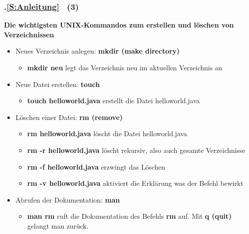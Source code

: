 \begin{frame}[t]%
\frametitle{\kap.\ref{S:Anleitung} \stitle\ (3)}%
\medskip

\textbf{Die wichtigsten UNIX-Kommandos zum erstellen und l\"oschen von Verzeichnissen}
\begin{itemize}
  \setlength{\itemsep}{4pt}
  \item Neues Verzeichnis anlegen: \textbf{mkdir (make directory)}
  \begin{itemize}
    \item \textbf{mkdir neu} legt das Verzeichnis neu im aktuellen Verzeichnis an
  \end{itemize}
  \item Neue Datei erstellen: \textbf{touch}
  \begin{itemize}
    \item \textbf{touch helloworld.java} erstellt die Datei helloworld.java
  \end{itemize}
  \item L\"oschen einer Datei: \textbf{rm (remove)}
  \begin{itemize}
    \setlength{\itemsep}{2pt}
    \item \textbf{rm helloworld.java} l\"oscht die Datei helloworld.java
    \item \textbf{rm -r helloworld.java} l\"oscht rekursiv, also auch gesamte Verzeichnisse
    \item \textbf{rm -f helloworld.java} erzwingt das L\"oschen
    \item \textbf{rm -v helloworld.java} aktiviert die Erkl\"arung was der Befehl bewirkt
  \end{itemize}
  \item Abrufen der Dokumentation: \textbf{man}
  \begin{itemize}
    \item \textbf{man rm} ruft die Dokumentation des Befehls \textbf{rm} auf. Mit \textbf{q (quit)} gelangt man zur\"uck.
  \end{itemize}
\end{itemize}

\end{frame}


